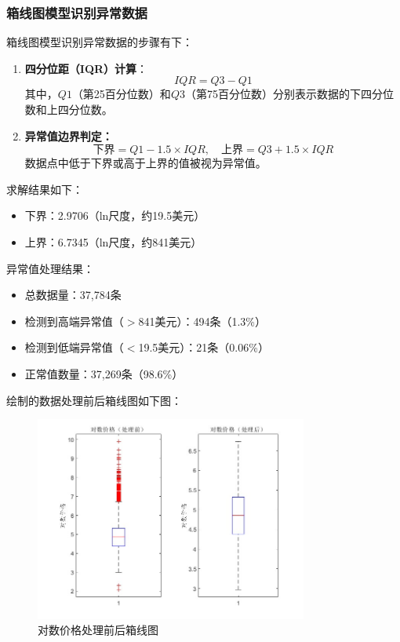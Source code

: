 \documentclass[12pt]{article}
\begin{document}
\begin{CJK}{UTF8}{gbsn}
	\subsubsection{箱线图模型识别异常数据}
	箱线图模型识别异常数据的步骤有下：
	
	\begin{enumerate}
		\item \textbf{四分位距（IQR）计算}：
		\begin{equation}
		IQR = Q3 - Q1
		\end{equation}
		其中，$Q1$（第25百分位数）和$Q3$（第75百分位数）分别表示数据的下四分位数和上四分位数。
		\item \textbf{异常值边界判定：}
		\begin{equation}
		\text{下界} = Q1 - 1.5 \times IQR, \quad \text{上界} = Q3 + 1.5 \times IQR
	    \end{equation}
		数据点中低于下界或高于上界的值被视为异常值。
	\end{enumerate}
	
	求解结果如下：
	
	\begin{itemize}
		\item 下界：2.9706（ln尺度，约19.5美元）
		\item 上界：6.7345（ln尺度，约841美元）
	\end{itemize}
	
	异常值处理结果：
	
	\begin{itemize}
		\item 总数据量：37,784条
		\item 检测到高端异常值（$>$841美元）：494条（1.3\%）
		\item 检测到低端异常值（$<$19.5美元）：21条（0.06\%）
		\item 正常值数量：37,269条（98.6\%）
	\end{itemize}
	
	绘制的数据处理前后箱线图如下图：
	
	\begin{figure}[H]
		\centering
		\includegraphics[width=0.8\textwidth]{pic/3.jpg} %
		\caption{对数价格处理前后箱线图}
		\label{fig:3}
	\end{figure}
	

\end{CJK}
\end{document}
